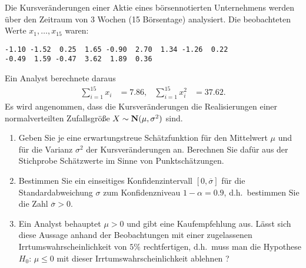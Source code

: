  Die Kursveränderungen einer Aktie eines
börsennotierten Unternehmens werden über den Zeitraum von 3 Wochen (15
Börsentage) analysiert. Die beobachteten Werte $x_{1},\dots ,x_{15}$ waren:
\begin{lstlisting}
-1.10 -1.52  0.25  1.65 -0.90  2.70  1.34 -1.26  0.22
-0.49  1.59 -0.47  3.62  1.89  0.36
\end{lstlisting}    
Ein Analyst berechnete daraus
\begin{align*}
    \sum_{i=1}^{15} x_i &= 7.86, & \sum_{i=1}^{15} x^{2}_i &= 37.62.
\end{align*}
Es wird angenommen, dass die Kursveränderungen die Realisierungen einer normalverteilten
Zufallsgröße $X\sim \mathbf N(\mu, \sigma^2)$ sind.
\begin{enumerate}
    \item Geben Sie je eine erwartungstreue Schätzfunktion für den Mittelwert $\mu$ und für
    die Varianz $\sigma^2$ der Kursveränderungen an. Berechnen Sie daf\"ur aus der Stichprobe Schätzwerte im
    Sinne von Punktsch\"atzungen.
    \item Bestimmen Sie ein einseitiges Konfidenzintervall $[0,\overline \sigma]$ f\"ur die Standardabweichung $\sigma$
    zum Konfidenzniveau $1-\alpha=0.9$, d.h.~bestimmen Sie die Zahl $\overline \sigma>0$.
    \item Ein Analyst behauptet $\mu>0$ und gibt eine Kaufempfehlung aus. Lässt
    sich diese Aussage anhand der Beobachtungen mit einer zugelassenen
    Irrtumswahrscheinlichkeit von $5\%$ rechtfertigen, d.h.~muss man die Hypothese $H_0: \, \mu \le 0$ 
    mit dieser Irrtums\-wahrscheinlichkeit   ablehnen ?
\end{enumerate}

